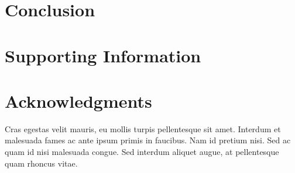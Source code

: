 \documentclass[10pt,a4paper]{article}  %
\begin{document}
\section{Conclusion}




\section{Supporting Information}



\section*{Acknowledgments}
Cras egestas velit mauris, eu mollis turpis pellentesque sit amet. Interdum et malesuada fames ac ante ipsum primis in faucibus. Nam id pretium nisi. Sed ac quam id nisi malesuada congue. Sed interdum aliquet augue, at pellentesque quam rhoncus vitae.

\nolinenumbers


\end{document}
